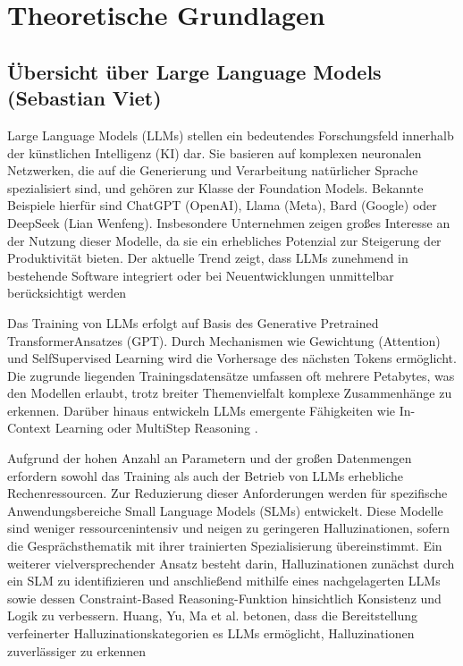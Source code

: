 \section{Theoretische Grundlagen}

\subsection{Übersicht über Large Language Models (Sebastian Viet)}

Large Language Models (LLMs) stellen ein bedeutendes Forschungsfeld innerhalb
der künstlichen Intelligenz (KI) dar. Sie basieren auf komplexen neuronalen
Netzwerken, die auf die Generierung und Verarbeitung natürlicher Sprache
spezialisiert sind, und gehören zur Klasse der Foundation Models. Bekannte
Beispiele hierfür sind ChatGPT (OpenAI), Llama (Meta), Bard (Google) oder
DeepSeek (Lian Wenfeng). Insbesondere Unternehmen zeigen großes Interesse an
der Nutzung dieser Modelle, da sie ein erhebliches Potenzial zur Steigerung
der Produktivität bieten. Der aktuelle Trend zeigt, dass LLMs zunehmend in
bestehende Software integriert oder bei Neuentwicklungen unmittelbar
berücksichtigt werden \autocites[Vgl.][S. 1-2,5]{lu2024taxonomy}[S. 1-2]{minaee2024survey}

Das Training von LLMs erfolgt auf Basis des Generative Pretrained
TransformerAnsatzes (GPT). Durch Mechanismen wie Gewichtung (Attention) und
SelfSupervised Learning wird die Vorhersage des nächsten Tokens ermöglicht.
Die zugrunde liegenden Trainingsdatensätze umfassen oft mehrere Petabytes, was
den Modellen erlaubt, trotz breiter Themenvielfalt komplexe Zusammenhänge zu
erkennen. Darüber hinaus entwickeln LLMs emergente Fähigkeiten wie In-Context
Learning oder MultiStep Reasoning \autocites[Vgl.][S. 6-10]{lu2024taxonomy}{lu2024taxonomy}[S. 1-2]{minaee2024survey}[S. 1-2]{naveed2024overview}.

Aufgrund der hohen Anzahl an Parametern und der großen Datenmengen erfordern
sowohl das Training als auch der Betrieb von LLMs erhebliche Rechenressourcen.
Zur Reduzierung dieser Anforderungen werden für spezifische Anwendungsbereiche
Small Language Models (SLMs) entwickelt. Diese Modelle sind weniger
ressourcenintensiv und neigen zu geringeren Halluzinationen, sofern die
Gesprächsthematik mit ihrer trainierten Spezialisierung übereinstimmt. Ein
weiterer vielversprechender Ansatz besteht darin, Halluzinationen zunächst
durch ein SLM zu identifizieren und anschließend mithilfe eines nachgelagerten
LLMs sowie dessen Constraint-Based Reasoning-Funktion hinsichtlich Konsistenz
und Logik zu verbessern. Huang, Yu, Ma et al. betonen, dass die Bereitstellung
verfeinerter Halluzinationskategorien es LLMs ermöglicht, Halluzinationen
zuverlässiger zu erkennen \autocites[Vlg.][]{kelbert2023llm}{huang2024hallucination}[S. 6-14]{hu2024slm}

